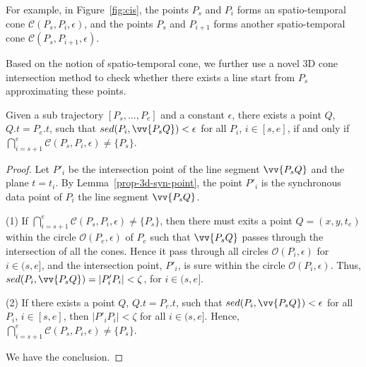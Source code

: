 For example, in Figure~\ref{fig:cis}, the points $P_s$ and $P_i$ forms an spatio-temporal cone $\mathcal{C}(P_s, P_i, \epsilon)$, and the points $P_s$ and $P_{i+1}$ forms another spatio-temporal cone $\mathcal{C}(P_s, P_{i+1}, \epsilon)$.

Based on the notion of spatio-temporal cone, we further use a novel 3D cone intersection method to check whether there exists a line start from $P_s$ approximating these points.

\begin{theorem}
\label{prop-3d-ci}
Given a sub trajectory $[P_s,...,P_e]$ and a constant $\epsilon$, there exists a point $Q$, $Q.t = P_e.t$, such that $sed(P_i, \vv{P_sQ})<\epsilon$ for all $P_i$, $i \in [s,e]$, if and only if $\bigcap_{i=s+1}^{e}{\mathcal{C}(P_s, P_i, \epsilon)} \ne \{P_s\}$.
\end{theorem}

\begin{proof}
Let $P'_i$ be the intersection point of the line segment $\vv{P_sQ}$ and the plane $t=t_i$.
By Lemma~\ref{prop-3d-syn-point}, the point $P'_i$ is the synchronous data point of $P_i$ \wrt the line segment $\vv{P_sQ}$.


(1) If $\bigcap_{i=s+1}^{e}{\mathcal{C}(P_s, P_i, \epsilon)} \ne \{P_s\}$, then there must exits a point $Q = (x,y,t_e)$ within the circle $\mathcal{O}(P_e, \epsilon)$ of $P_e$ such that $\vv{P_sQ}$ passes through the intersection of all the cones. Hence it pass through all circles $\mathcal{O}(P_i, \epsilon)$ for $i \in (s, e]$, and the intersection point, $P'_i$, is sure within the circle $\mathcal{O}(P_i, \epsilon)$. Thus, $sed(P_i, \vv{P_sQ}) = |P'_iP_i| < \zeta$, for $i \in (s, e]$.

(2) If there exists a point $Q$, $Q.t = P_e.t$, such that $sed(P_i, \vv{P_sQ})<\epsilon$ for all $P_i$, $i \in [s,e]$, then $|P'_iP_i| < \zeta$ for all $i \in (s, e]$. Hence, $\bigcap_{i=s+1}^{e}{\mathcal{C}(P_s, P_i, \epsilon)} \ne \{P_s\}$.

We have the conclusion.
\end{proof}


